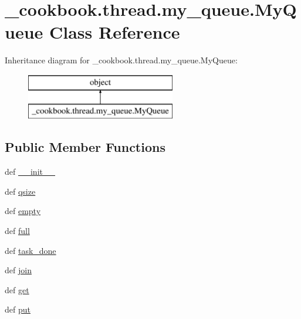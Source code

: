 \hypertarget{class__cookbook_1_1thread_1_1my__queue_1_1MyQueue}{\section{\-\_\-cookbook.\-thread.\-my\-\_\-queue.\-My\-Queue Class Reference}
\label{class__cookbook_1_1thread_1_1my__queue_1_1MyQueue}
}
Inheritance diagram for \-\_\-cookbook.\-thread.\-my\-\_\-queue.\-My\-Queue\-:\begin{figure}[H]
\begin{center}
\leavevmode
\includegraphics[height=2.000000cm]{d6/dcc/class__cookbook_1_1thread_1_1my__queue_1_1MyQueue}
\end{center}
\end{figure}
\subsection*{Public Member Functions}
\begin{DoxyCompactItemize}
\item 
def \hyperlink{class__cookbook_1_1thread_1_1my__queue_1_1MyQueue_a6f9f8590a70aca88737939c2e793b854}{\-\_\-\-\_\-init\-\_\-\-\_\-}
\item 
def \hyperlink{class__cookbook_1_1thread_1_1my__queue_1_1MyQueue_a628dba4427a33d27eecd3fbfc7c2366d}{qsize}
\item 
def \hyperlink{class__cookbook_1_1thread_1_1my__queue_1_1MyQueue_a80d8c2b5b61df971805ad4aad520c622}{empty}
\item 
def \hyperlink{class__cookbook_1_1thread_1_1my__queue_1_1MyQueue_ab34edaaa1bcc947dfc10ccaffddfd9ef}{full}
\item 
def \hyperlink{class__cookbook_1_1thread_1_1my__queue_1_1MyQueue_addb2a52a6b08211ecd10ffee6614f55e}{task\-\_\-done}
\item 
def \hyperlink{class__cookbook_1_1thread_1_1my__queue_1_1MyQueue_a9b25ef168e9200c7091c6bb1faf0ad84}{join}
\item 
def \hyperlink{class__cookbook_1_1thread_1_1my__queue_1_1MyQueue_abb8937cad32dd7fb7d5c6a7f77041e9b}{get}
\item 
def \hyperlink{class__cookbook_1_1thread_1_1my__queue_1_1MyQueue_adac4ae837b6ef2f9150741a9e2cd23b6}{put}
\end{DoxyCompactItemize}
